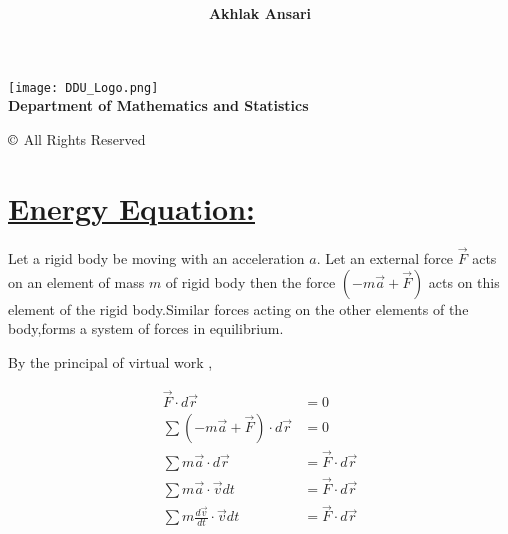 \documentclass[a4paper,12pt]{article}
\title{\underline {\sc {\textbf RIGID BODY DYNAMICS}}}
\author{\textbf{Akhlak Ansari}}
\begin{document}
    \maketitle

    \begin{center}
        \texttt{[image: DDU\_Logo.png]}\\
        {\textbf {\Large Department of Mathematics and Statistics}}
    \end{center}

    \vspace{6cm}

    \begin{center}
        \Large{$\copyright$ All Rights Reserved}
    \end{center}

    \pagebreak
   
    \section*{\underline{Energy Equation:}}

    Let a rigid body be moving with an acceleration $a$. Let an external force $\vec{F}$ acts on an element of mass $m$ of rigid body then the force $\left(-m\vec{a}  + \vec{F}\right)$ acts on this element of the rigid body.Similar forces acting on the other elements of the body,forms a system of forces in equilibrium.

    By the principal of virtual work ,

  
    \begin{equation*}
        \begin{split}
            \vec{F}\cdot d\vec{r} & = 0\\
            \sum\left(-m\vec{a} + \vec{F}\right)\cdot d\vec{r} & = 0\\
            \sum m\vec{a}\cdot d\vec{r} & = \vec{F}\cdot d\vec{ r}\\
            \sum m\vec{a}\cdot \vec{v}dt & = \vec{F}\cdot d\vec{r}\\
            \sum m\frac{d\vec{v}}{dt}\cdot \vec{v}dt & = \vec{F}\cdot d\vec{r}\\
        \end{split}
    \end{equation*}
\end{document}
